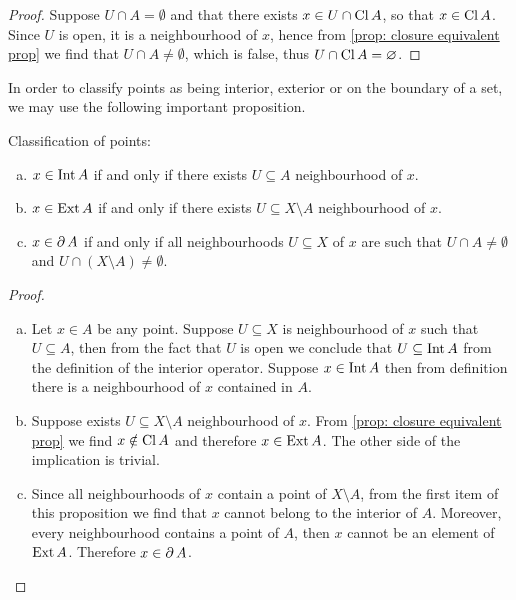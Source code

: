 \begin{proof}
Suppose \(U \cap A = \emptyset\) and that there exists \(x \in U \cap
\operatorname{Cl} A\), so that \(x \in \operatorname{Cl} A\). Since \(U\) is open, it
is a neighbourhood of \(x\), hence from \cref{prop: closure equivalent prop}
we find that \(U \cap A \neq \emptyset\), which is false, thus \(U \cap
\operatorname{Cl} A = \varnothing\).
\end{proof}

In order to classify points as being interior, exterior or on the boundary of a
set, we may use the following important proposition.

\begin{proposition}
\label{prop:classification-int-ext-boundary-points}
Classification of points:
\begin{enumerate}[(a)]\setlength\itemsep{0em}
\item \(x \in \operatorname{Int} A\) if and only if there exists \(U \subseteq A\)
  neighbourhood of \(x\).

\item \(x \in \operatorname{Ext} A\) if and only if there exists \(U \subseteq X \setminus A\)
  neighbourhood of \(x\).

\item \(x \in \operatorname{\partial} A\) if and only if all neighbourhoods \(U \subseteq X\)
  of \(x\) are such that \(U \cap A \neq \emptyset\) and \(U \cap (X \setminus
  A) \neq \emptyset\).
\end{enumerate}
\end{proposition}

\begin{proof}
\begin{enumerate}[(a)]\setlength\itemsep{0em}
\item Let \(x \in A\) be any point. Suppose \(U \subseteq X\) is neighbourhood
  of \(x\) such that \(U \subseteq A\), then from the fact that \(U\) is open we
  conclude that \(U \subseteq \operatorname{Int} A\) from the definition of the interior
  operator. Suppose \(x \in \operatorname{Int} A\) then from definition there is a
  neighbourhood of \(x\) contained in \(A\).

\item Suppose exists \(U \subseteq X \setminus A\) neighbourhood of \(x\). From
  \cref{prop: closure equivalent prop} we find \(x \notin \operatorname{Cl} A\) and
  therefore \(x \in \operatorname{Ext} A\). The other side of the implication is trivial.

\item Since all neighbourhoods of \(x\) contain a point of \(X \setminus A\),
  from the first item of this proposition we find that \(x\) cannot belong to
  the interior of \(A\). Moreover, every neighbourhood contains a point of
  \(A\), then \(x\) cannot be an element of \(\operatorname{Ext} A\). Therefore \(x \in
  \operatorname{\partial} A\).
\end{enumerate}
\end{proof}

